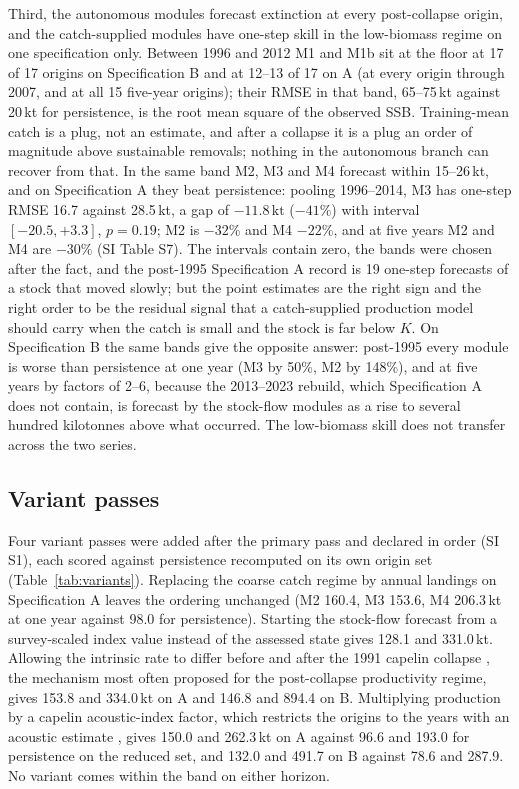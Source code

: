 \documentclass[preprint,11pt,authoryear]{elsarticle}
\theoremstyle{definition}
\theoremstyle{remark}
\newcommand{\kt}{\,\mathrm{kt}}
\begin{document}
Third, the autonomous modules forecast extinction at every post-collapse origin, and the catch-supplied modules have one-step skill in the low-biomass regime on one specification only. Between 1996 and 2012 M1 and M1b sit at the floor at 17 of 17 origins on Specification B and at 12--13 of 17 on A (at every origin through 2007, and at all 15 five-year origins); their RMSE in that band, 65--75\,kt against 20\,kt for persistence, is the root mean square of the observed SSB. Training-mean catch is a plug, not an estimate, and after a collapse it is a plug an order of magnitude above sustainable removals; nothing in the autonomous branch can recover from that. In the same band M2, M3 and M4 forecast within 15--26\,kt, and on Specification A they beat persistence: pooling 1996--2014, M3 has one-step RMSE 16.7 against 28.5\,kt, a gap of $-11.8\kt$ ($-41\%$) with interval $[-20.5, +3.3]$, $p = 0.19$; M2 is $-32\%$ and M4 $-22\%$, and at five years M2 and M4 are $-30\%$ (SI Table S7). The intervals contain zero, the bands were chosen after the fact, and the post-1995 Specification A record is 19 one-step forecasts of a stock that moved slowly; but the point estimates are the right sign and the right order to be the residual signal that a catch-supplied production model should carry when the catch is small and the stock is far below $K$. On Specification B the same bands give the opposite answer: post-1995 every module is worse than persistence at one year (M3 by 50\%, M2 by 148\%), and at five years by factors of 2--6, because the 2013--2023 rebuild, which Specification A does not contain, is forecast by the stock-flow modules as a rise to several hundred kilotonnes above what occurred. The low-biomass skill does not transfer across the two series.

\FloatBarrier
\subsection{Variant passes}\label{sec:variants}

Four variant passes were added after the primary pass and declared in order (SI S1), each scored against persistence recomputed on its own origin set (Table~\ref{tab:variants}). Replacing the coarse catch regime by annual landings on Specification A leaves the ordering unchanged (M2 160.4, M3 153.6, M4 206.3\,kt at one year against 98.0 for persistence). Starting the stock-flow forecast from a survey-scaled index value instead of the assessed state gives 128.1 and 331.0\,kt. Allowing the intrinsic rate to differ before and after the 1991 capelin collapse \citep{Buren2014,DFO2024b}, the mechanism most often proposed for the post-collapse productivity regime, gives 153.8 and 334.0\,kt on A and 146.8 and 894.4 on B. Multiplying production by a capelin acoustic-index factor, which restricts the origins to the years with an acoustic estimate \citep{Murphy2025,NAFC2025}, gives 150.0 and 262.3\,kt on A against 96.6 and 193.0 for persistence on the reduced set, and 132.0 and 491.7 on B against 78.6 and 287.9. No variant comes within the band on either horizon.
\end{document}

